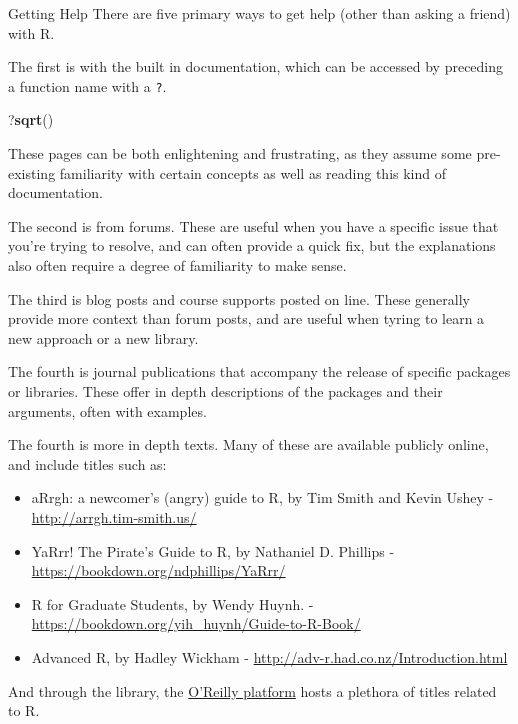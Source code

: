 \documentclass[
  ignorenonframetext,
]{beamer}
\newenvironment{Shaded}{\begin{snugshade}}{\end{snugshade}}
\newcommand{\FunctionTok}[1]{\textcolor[rgb]{0.13,0.29,0.53}{\textbf{#1}}}
\newcommand{\NormalTok}[1]{#1}
\providecommand{\tightlist}{%
  \setlength{\itemsep}{0pt}\setlength{\parskip}{0pt}}
\begin{document}
\begin{frame}[fragile]{Getting Help}
\protect\hypertarget{getting-help}{}
There are five primary ways to get help (other than asking a friend)
with R.

The first is with the built in documentation, which can be accessed by
preceding a function name with a \texttt{?}.

\begin{Shaded}
\begin{Highlighting}[]
\NormalTok{?}\FunctionTok{sqrt}\NormalTok{()}
\end{Highlighting}
\end{Shaded}

These pages can be both enlightening and frustrating, as they assume
some pre-existing familiarity with certain concepts as well as reading
this kind of documentation.

The second is from forums. These are useful when you have a specific
issue that you're trying to resolve, and can often provide a quick fix,
but the explanations also often require a degree of familiarity to make
sense.

The third is blog posts and course supports posted on line. These
generally provide more context than forum posts, and are useful when
tyring to learn a new approach or a new library.

The fourth is journal publications that accompany the release of
specific packages or libraries. These offer in depth descriptions of the
packages and their arguments, often with examples.

The fourth is more in depth texts. Many of these are available publicly
online, and include titles such as:

\begin{itemize}
\tightlist
\item
  aRrgh: a newcomer's (angry) guide to R, by Tim Smith and Kevin Ushey -
  \url{http://arrgh.tim-smith.us/}
\item
  YaRrr! The Pirate's Guide to R, by Nathaniel D. Phillips -
  \url{https://bookdown.org/ndphillips/YaRrr/}
\item
  R for Graduate Students, by Wendy Huynh. -
  \url{https://bookdown.org/yih_huynh/Guide-to-R-Book/}
\item
  Advanced R, by Hadley Wickham -
  \url{http://adv-r.had.co.nz/Introduction.html}
\end{itemize}

And through the library, the
\href{https://resources.library.ubc.ca/page.php?details=oreilly-for-higher-education\&id=2460}{O'Reilly
platform} hosts a plethora of titles related to R.
\end{frame}
\end{document}
